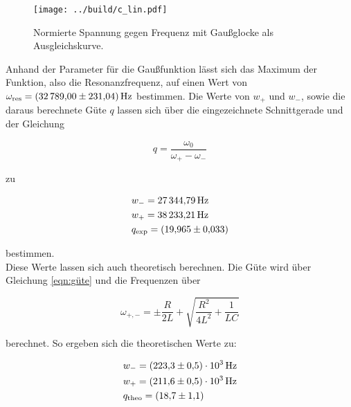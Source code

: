 \begin{figure}[H]
    \texttt{[image: ../build/c\_lin.pdf]}
    \caption{Normierte Spannung gegen Frequenz mit Gaußglocke als Ausgleichskurve.}
\end{figure}

\noindent Anhand der Parameter für die Gaußfunktion lässt sich das Maximum der Funktion, also die Resonanzfrequenz, auf einen Wert von 
$\omega_\text{res} = \qty{32789.00 \pm 231.04}{\hertz}$ bestimmen.
Die Werte von $w_+$ und $w_-$, sowie die daraus berechnete Güte $q$ lassen sich über die eingezeichnete Schnittgerade und der Gleichung

\begin{equation*}
    q = \frac{\omega_0}{\omega_+ - \omega_-}
\end{equation*}

\noindent zu 

\begin{align}
    &w_- = \qty{27344.79}{\hertz} \\
    &w_+ = \qty{38233.21}{\hertz} \\
    &q_\text{exp}   = \qty{19.965 \pm 0.033}{}
\end{align}

\noindent bestimmen. \\
\noindent Diese Werte lassen sich auch theoretisch berechnen. Die Güte wird über Gleichung \eqref{eqn:güte} und die Frequenzen über

\begin{equation*}
    \omega_{+,-}= \pm \frac{R}{2L} + \sqrt{\frac{R^2}{4L^2} +\frac{1}{LC}}
\end{equation*}

berechnet. So ergeben sich die theoretischen Werte zu:

\begin{align}
    &w_- = \qty{223.3 \pm 0.5 e3}{\hertz} \\
    &w_+ = \qty{211.6 \pm 0.5 e3}{\hertz} \\
    &q_\text{theo} = \qty{18.7 \pm 1.1}{}
\end{align}



